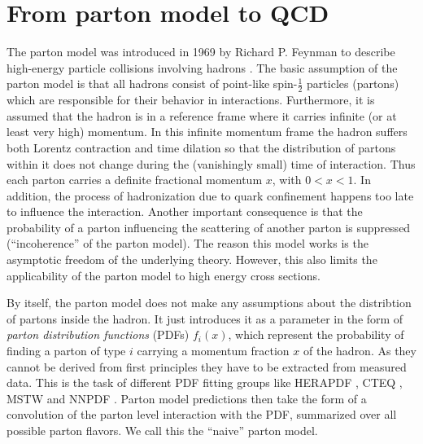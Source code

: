 \section{From parton model to QCD}
The parton model was introduced in 1969 by Richard P. Feynman to describe high-energy particle collisions involving hadrons \cite{feynman1969}.
The basic assumption of the parton model is that all hadrons consist of point-like spin-$\frac{1}{2}$ particles (partons) which are responsible for their behavior in interactions.
Furthermore, it is assumed that the hadron is in a reference frame where it carries infinite (or at least very high) momentum.
In this infinite momentum frame the hadron suffers both Lorentz contraction and time dilation so that the distribution of partons within it does not change during the (vanishingly small) time of interaction.
Thus each parton carries a definite fractional momentum $x$, with $0<x<1$.
In addition, the process of hadronization due to quark confinement happens too late to influence the interaction.
Another important consequence is that the probability of a parton influencing the scattering of another parton is suppressed (\enquote{incoherence} of the parton model).
The reason this model works is the asymptotic freedom of the underlying theory.
However, this also limits the applicability of the parton model to high energy cross sections.

By itself, the parton model does not make any assumptions about the distribtion of partons inside the hadron.
It just introduces it as a parameter in the form of \textit{parton distribution functions} (PDFs) $f_i(x)$, which represent the probability of finding a parton of type $i$ carrying a momentum fraction $x$ of the hadron.
As they cannot be derived from first principles they have to be extracted from measured data.
This is the task of different PDF fitting groups like HERAPDF \cite{herapdf}, CTEQ \cite{ct10}, MSTW \cite{mstw2008} and NNPDF \cite{nnpdf1}.
Parton model predictions then take the form of a convolution of the parton level interaction with the PDF, summarized over all possible parton flavors.
We call this the \enquote{naive} parton model.

